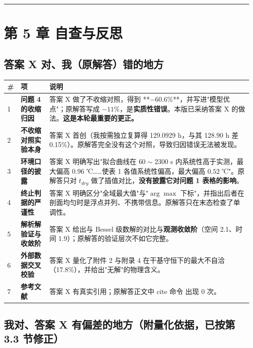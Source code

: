 \vspace{1mm}\hrule\vspace{1mm}


\section{第 5 章 自查与反思}


\subsection{答案 X 对、我（原解答）错的地方}


\begin{center}
\small
\begin{tabular}{lll}
\toprule
\# & 项 & 说明 \\
\midrule
1 & \textbf{问题 4 的收缩归因} & 答案 X 做了不收缩对照，得到 **$-60.6\%$**，并写进"模型优点"；原解答写成 $-11\%$，是\textbf{实质性错误}。本版已采纳答案 X 的做法。\textbf{这是本轮最重要的更正。} \\
2 & \textbf{不收缩对照实验本身} & 答案 X 首创（我按需独立复算得 129.0929 h，与其 128.90 h 差 0.15\%）。原解答完全没有这个对照，导致归因错误无法被发现。 \\
3 & \textbf{环境口径的披露} & 答案 X 明确写出"拟合曲线在 $60\sim2300$ s 内系统性高于实测，最大偏高 $0.96$ ℃……使表 1 各值系统性偏高，最大偏高 $0.52$ ℃"。原解答只对 $t_{dry}$ 做了插值对比，\textbf{没有披露它对问题 1 表格的影响}。 \\
4 & \textbf{终止判据的严谨性} & 答案 X 明确区分"全域最大值"与"$\arg\max$ 下标"，并指出后者在剖面均匀时是浮点并列、不携带信息。原解答只在末态检查了单调性。 \\
5 & \textbf{解析解验证与收敛阶} & 答案 X 给出与 Bessel 级数解的对比与\textbf{观测收敛阶}（空间 2.1、时间 1.9）；原解答的验证层次不如它完整。 \\
6 & \textbf{外部数据交叉校验} & 答案 X 量化了附件 2 与附录 4 在干基守恒下的最大不自洽（17.8\%），并给出"无解"的物理含义。 \\
7 & \textbf{参考文献} & 答案 X 有真实引用；原解答正文中 cite 命令 出现 0 次。 \\
\bottomrule
\end{tabular}
\end{center}


\subsection{我对、答案 X 有偏差的地方（附量化依据，\textbf{已按第 3.3 节修正}）}



